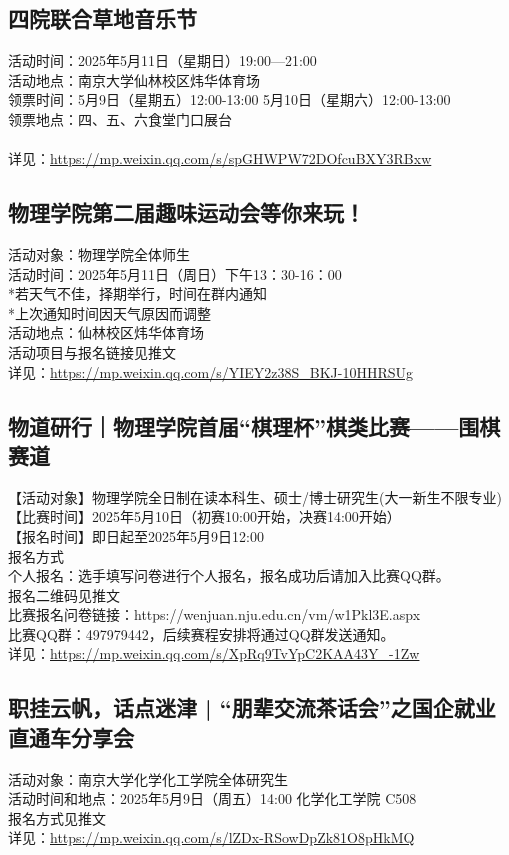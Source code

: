 \documentclass[letterpaper, 12pt]{article}
\begin{document}
\begin{multicols}{2}
\subsection{四院联合草地音乐节} %
活动时间：2025年5月11日（星期日）19:00—21:00
\\活动地点：南京大学仙林校区炜华体育场
\\领票时间：5月9日（星期五）12:00-13:00  5月10日（星期六）12:00-13:00
\\领票地点：四、五、六食堂门口展台
\\
\\详见：\url{https://mp.weixin.qq.com/s/spGHWPW72DOfcuBXY3RBxw}

\subsection{物理学院第二届趣味运动会等你来玩！} %
活动对象：物理学院全体师生
\\活动时间：2025年5月11日（周日）下午13：30-16：00
\\*若天气不佳，择期举行，时间在群内通知
\\*上次通知时间因天气原因而调整
\\活动地点：仙林校区炜华体育场
\\活动项目与报名链接见推文
\\详见：\url{https://mp.weixin.qq.com/s/YIEY2z38S_BKJ-10HHRSUg}

\subsection{物道研行｜物理学院首届“棋理杯”棋类比赛——围棋赛道} %
【活动对象】物理学院全日制在读本科生、硕士/博士研究生(大一新生不限专业)
\\【比赛时间】2025年5月10日（初赛10:00开始，决赛14:00开始）
\\【报名时间】即日起至2025年5月9日12:00
\\ 报名方式 
\\个人报名：选手填写问卷进行个人报名，报名成功后请加入比赛QQ群。
\\报名二维码见推文
\\比赛报名问卷链接：https://wenjuan.nju.edu.cn/vm/w1Pkl3E.aspx
\\比赛QQ群：497979442，后续赛程安排将通过QQ群发送通知。
\\详见：\url{https://mp.weixin.qq.com/s/XpRq9TvYpC2KAA43Y_-1Zw}

\subsection{职挂云帆，话点迷津 | “朋辈交流茶话会”之国企就业直通车分享会} %
活动对象：南京大学化学化工学院全体研究生
\\活动时间和地点：2025年5月9日（周五）14:00 化学化工学院 C508
\\报名方式见推文
\\详见：\url{https://mp.weixin.qq.com/s/lZDx-RSowDpZk81O8pHkMQ}


\end{multicols}
\end{document}
